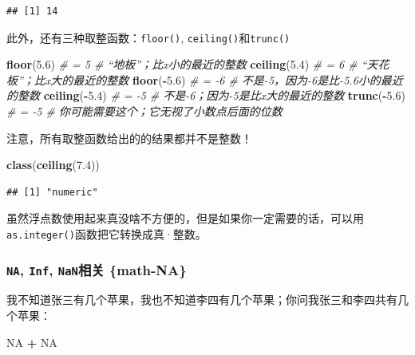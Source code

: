 \documentclass[]{book}
\newenvironment{Shaded}{\begin{snugshade}}{\end{snugshade}}
\newcommand{\CommentTok}[1]{\textcolor[rgb]{0.56,0.35,0.01}{\textit{#1}}}
\newcommand{\FloatTok}[1]{\textcolor[rgb]{0.00,0.00,0.81}{#1}}
\newcommand{\KeywordTok}[1]{\textcolor[rgb]{0.13,0.29,0.53}{\textbf{#1}}}
\newcommand{\NormalTok}[1]{#1}
\newcommand{\OperatorTok}[1]{\textcolor[rgb]{0.81,0.36,0.00}{\textbf{#1}}}
\newcommand{\OtherTok}[1]{\textcolor[rgb]{0.56,0.35,0.01}{#1}}
\newcommand{\StringTok}[1]{\textcolor[rgb]{0.31,0.60,0.02}{#1}}
\begin{document}
\begin{verbatim}
## [1] 14
\end{verbatim}

此外，还有三种取整函数：\texttt{floor()}, \texttt{ceiling()}和\texttt{trunc()}

\begin{Shaded}
\begin{Highlighting}[]
\KeywordTok{floor}\NormalTok{(}\FloatTok{5.6}\NormalTok{) }\CommentTok{# = 5 # “地板”；比x小的最近的整数}
\KeywordTok{ceiling}\NormalTok{(}\FloatTok{5.4}\NormalTok{) }\CommentTok{# = 6 # “天花板”；比x大的最近的整数}
\KeywordTok{floor}\NormalTok{(}\OperatorTok{-}\FloatTok{5.6}\NormalTok{) }\CommentTok{# = -6 # 不是-5，因为-6是比-5.6小的最近的整数}
\KeywordTok{ceiling}\NormalTok{(}\OperatorTok{-}\FloatTok{5.4}\NormalTok{) }\CommentTok{# = -5 # 不是-6；因为-5是比x大的最近的整数}
\KeywordTok{trunc}\NormalTok{(}\OperatorTok{-}\FloatTok{5.6}\NormalTok{) }\CommentTok{# = -5 # 你可能需要这个；它无视了小数点后面的位数}
\end{Highlighting}
\end{Shaded}

注意，所有取整函数给出的的结果都并不是整数！

\begin{Shaded}
\begin{Highlighting}[]
\KeywordTok{class}\NormalTok{(}\KeywordTok{ceiling}\NormalTok{(}\FloatTok{7.4}\NormalTok{))}
\end{Highlighting}
\end{Shaded}

\begin{verbatim}
## [1] "numeric"
\end{verbatim}

虽然浮点数使用起来真没啥不方便的，但是如果你一定需要的话，可以用\texttt{as.integer()}函数把它转换成真·整数。

\hypertarget{na-inf-nan-math-na}{%
\subsubsection{\texorpdfstring{\texttt{NA}, \texttt{Inf}, \texttt{NaN}相关 \{math-NA\}}{NA, Inf, NaN相关 \{math-NA\}}}\label{na-inf-nan-math-na}}

我不知道张三有几个苹果，我也不知道李四有几个苹果；你问我张三和李四共有几个苹果：

\begin{Shaded}
\begin{Highlighting}[]
\OtherTok{NA} \OperatorTok{+}\StringTok{ }\OtherTok{NA}
\end{Highlighting}
\end{Shaded}
\end{document}
